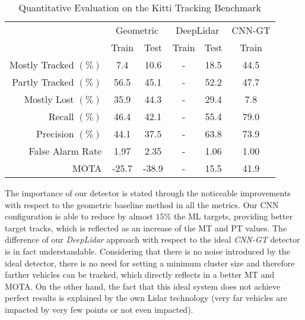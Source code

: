 \documentclass[letterpaper, 10 pt, conference]{ieeeconf}  %
\begin{document}
\begin{table}[]
\centering
\caption{Quantitative Evaluation on the Kitti Tracking Benchmark}
\label{tab:results}
\begin{tabular}{r||c|c||c|c||c||}
\multicolumn{1}{l||}{} & \multicolumn{2}{c||}{Geometric}                         & \multicolumn{2}{c||}{DeepLidar}                          & \multicolumn{1}{c||}{CNN-GT}                            \\ %
\multicolumn{1}{l||}{} & \multicolumn{1}{c|}{Train} & \multicolumn{1}{c||}{Test} & \multicolumn{1}{c|}{Train} & \multicolumn{1}{c||}{Test} & \multicolumn{1}{c||}{Train} \\ \hline \hline
Mostly Tracked $(\%)$  &   7.4    	&    10.6   	&   -  &    18.5    &    44.5  \\ %
Partly Tracked $(\%)$  &   56.5    	&    45.1   	&   -  &    52.2    &    47.7  \\ %
Mostly Lost  $(\%)$    &   35.9    	&    44.3		&   -  &    29.4    &    7.8  \\ \hline
Recall      $(\%)$     &   46.4   	&    42.1   	&   -  &    55.4    &    79.0  \\ %
Precision   $(\%)$     &   44.1    	&    37.5   	&   -  &    63.8    &    73.9  \\ %
False Alarm Rate 	   &   1.97    	&    2.35   	&   -  &    1.06    &    1.00  \\ \hline
MOTA             	   &  -25.7		&   -38.9   	&   -  &    15.5    &    41.9  \\ \hline

\end{tabular}
\end{table}
The importance of our detector is stated through the noticeable improvements with respect to the geometric baseline method in all the metrics. Our CNN configuration is able to reduce by almost $15\%$ the ML targets, providing better target tracks, which is reflected as an increase of the MT and PT values.
The difference of our \textit{DeepLidar} approach with respect to the ideal \textit{CNN-GT} detector is in fact understandable. Considering that there is no noise introduced by the ideal detector, there is no need for setting a minimum cluster size and therefore farther vehicles can be tracked, which directly reflects in a better MT and MOTA.  
On the other hand, the fact that this ideal system does not achieve perfect results is explained by the own Lidar technology (very far vehicles are impacted by very few points or not even impacted). 
\end{document}
